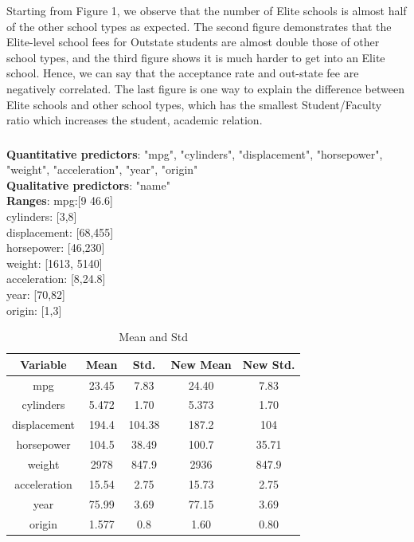 \documentclass{article}
\begin{document}
Starting from Figure 1, we observe that the number of Elite schools is almost half of the other school types as expected.
The second figure demonstrates that the Elite-level school fees for Outstate students are almost double those of other school types, and the third figure shows it is much harder to get into an Elite school. Hence, we can say that the acceptance rate and out-state fee are negatively correlated. The last figure is one way to explain the difference between Elite schools and other school types, which has the smallest Student/Faculty ratio which increases the student, academic relation.

\subsubsection{}
\textbf{Quantitative predictors}: "mpg", "cylinders", "displacement", "horsepower", "weight", "acceleration", "year", "origin" \\
\textbf{Qualitative predictors}: "name"\\
\textbf{Ranges}:
mpg:[9 46.6]\\
cylinders: [3,8]\\
displacement: [68,455]\\
horsepower: [46,230]\\
weight: [1613, 5140]\\
acceleration: [8,24.8]\\
year: [70,82]\\
origin: [1,3]
\begin{table}[htbp]
  \centering
  \caption{Mean and Std} 
  \label{tab:example}
  \begin{tabular}{|c|c|c|c|c|}
    \hline
    \textbf{Variable} & \textbf{Mean} & \textbf{Std.} &
    \textbf{New Mean}&
    \textbf{New Std.}\\
    \hline
    mpg & 23.45 & 7.83 & 24.40 & 7.83 \\
    \hline
    cylinders & 5.472 & 1.70 & 5.373 &  1.70\\
    \hline
    displacement & 194.4 & 104.38 & 187.2 & 104 \\
    \hline
    horsepower & 104.5 & 38.49 & 100.7 & 35.71\\
    \hline
    weight & 2978 & 847.9 & 2936 & 847.9 \\
    \hline
    acceleration & 15.54 & 2.75 & 15.73 & 2.75\\
    \hline
    year & 75.99 & 3.69 & 77.15 & 3.69\\
    \hline
    origin & 1.577 & 0.8 & 1.60 & 0.80\\
    \hline
  \end{tabular}
\end{table} \\
\end{document}
